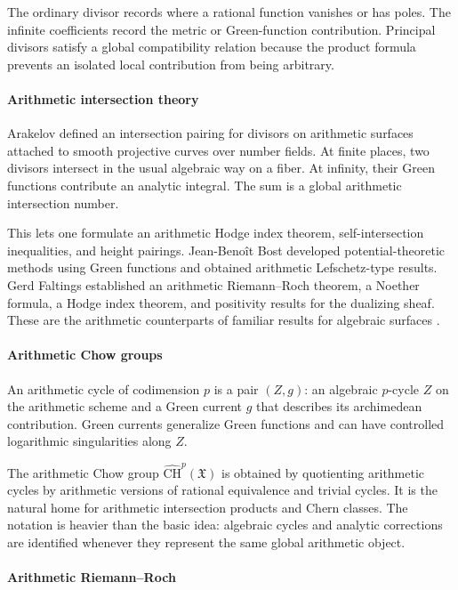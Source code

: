 The ordinary divisor records where a rational function vanishes or has poles. The infinite coefficients record the metric or Green-function contribution. Principal divisors satisfy a global compatibility relation because the product formula prevents an isolated local contribution from being arbitrary.

\paragraph{Arithmetic intersection theory}

Arakelov defined an intersection pairing for divisors on arithmetic surfaces attached to smooth projective curves over number fields. At finite places, two divisors intersect in the usual algebraic way on a fiber. At infinity, their Green functions contribute an analytic integral. The sum is a global arithmetic intersection number.

This lets one formulate an arithmetic Hodge index theorem, self-intersection inequalities, and height pairings. Jean-Benoît Bost developed potential-theoretic methods using Green functions and obtained arithmetic Lefschetz-type results. Gerd Faltings established an arithmetic Riemann--Roch theorem, a Noether formula, a Hodge index theorem, and positivity results for the dualizing sheaf. These are the arithmetic counterparts of familiar results for algebraic surfaces \cite{arakelov_theory_ref3,arakelov_theory_ref5}.

\paragraph{Arithmetic Chow groups}

An arithmetic cycle of codimension $p$ is a pair $(Z,g)$: an algebraic $p$-cycle $Z$ on the arithmetic scheme and a Green current $g$ that describes its archimedean contribution. Green currents generalize Green functions and can have controlled logarithmic singularities along $Z$.

The arithmetic Chow group $\widehat{\mathrm{CH}}^p(\mathfrak X)$ is obtained by quotienting arithmetic cycles by arithmetic versions of rational equivalence and trivial cycles. It is the natural home for arithmetic intersection products and Chern classes. The notation is heavier than the basic idea: algebraic cycles and analytic corrections are identified whenever they represent the same global arithmetic object.

\paragraph{Arithmetic Riemann--Roch}

